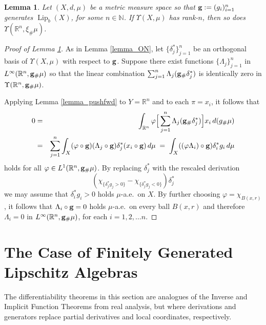 \documentclass[reqno]{amsart}
\theoremstyle{plain}
\newtheorem{lemma}[thm]{Lemma}
\theoremstyle{definition}
\theoremstyle{remark}
\numberwithin{equation}{section}
\renewcommand{\d}{\delta}
\newcommand{\Lip}{\operatorname{Lip}}
\newcommand{\N}{\mathbb{N}}
\newcommand{\R}{\mathbb{R}}
\newcommand{\U}{\Upsilon}
\begin{document}
\begin{lemma} \label{lemma_fullrank}
Let $(X,d,\mu)$ be a metric measure space so that ${\bf g} := (g_i)_{i=1}^n$ generates $\Lip_b(X)$, for some $n \in \N$.  If $\U(X,\mu)$ has rank-$n$, then so does $\U(\R^n,\xi_\#\mu)$.
\end{lemma}

\begin{proof}[Proof of Lemma \ref{lemma_fullrank}]
As in Lemma \ref{lemma_ON}, let $\{\d_j^*\}_{j=1}^n$ be an orthogonal basis of $\U(X,\mu)$ with respect to ${\bf g}$. %
Suppose there exist functions $\{\Lambda_j\}_{j=1}^n$ in $L^\infty(\R^n,{\bf g}_\#\mu)$ %
so that the linear combination $\sum_{j=1}^n \Lambda_j ({\bf g}_\#\d_j^*)$ is identically zero in $\U(\R^n,{\bf g}_\#\mu)$.

Applying Lemma \ref{lemma_pushfwd} to $Y = \R^n$ and to each $\pi = x_i$, it follows that
\begin{eqnarray*}
0 &=&
\int_{\R^n} \varphi \Big[
\sum_{j=1}^n \Lambda_j({\bf g}_\#\d_j^*)
\Big]
x_i \, d(g_\#\mu) \\ &=&
\sum_{j=1}^n \int_X (\varphi \circ {\bf g}) (\Lambda_j \circ {\bf g})\d_j^*(x_i \circ {\bf g}) \, d\mu \;=\;
\int_X ((\varphi \Lambda_i) \circ {\bf {\bf g}}) \d_i^*g_i \, d\mu
\end{eqnarray*}
holds for all $\varphi \in L^1(\R^n,{\bf g}_\#\mu)$.  By replacing $\d_j^*$ with the rescaled derivation
$$
(\chi_{\{\d_j^*g_j > 0\}} - \chi_{\{\d_j^*g_j < 0\}})\d_j^*
$$
we may assume that $\d_i^*g_i > 0$ holds $\mu$-a.e.\ on $X$.  By further choosing $\varphi = \chi_{B(x,r)}$, it follows that $\Lambda_i \circ {\bf g} = 0$ holds $\mu$-a.e.\ on every ball $B(x,r)$ and therefore $\Lambda_i = 0$ in $L^\infty(\R^n,{\bf g}_\#\mu)$, for each $i = 1, 2, \ldots n$.%
\end{proof}



\section{The Case of Finitely Generated Lipschitz Algebras} \label{sect_fingen}

The differentiability theorems in this section are analogues of the Inverse and Implicit Function Theorems from real analysis, but where derivations and generators replace partial derivatives and local coordinates, respectively.  
\end{document}
